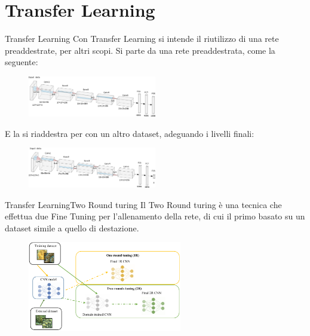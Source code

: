 \documentclass[aspectratio=169]{beamer}
\begin{document}
\section{Transfer Learning}
\begin{frame}{Transfer Learning}
    Con Transfer Learning si intende il riutilizzo di una rete preaddestrate, per altri scopi. Si parte da una rete preaddestrata, come la seguente:
    \begin{figure}[ht]
        \centering
        \includegraphics[width=0.5\textwidth]{addestramento-rete-neurale/alexnet.pdf}
    \end{figure}
    E la si riaddestra per con un altro  dataset, adeguando i livelli finali:
    \begin{figure}[ht]
        \centering
        \includegraphics[width=0.5\textwidth]{addestramento-rete-neurale/alexnet-tl.pdf}
    \end{figure}
\end{frame}

\begin{frame}{Transfer Learning}{Two Round turing}
    Il Two Round turing è una tecnica che effettua due Fine Tuning per l'allenamento della rete, di cui il primo basato su un dataset simile a quello di destazione.
    \begin{figure}[ht]
        \centering
        \includegraphics[width=0.6\textwidth]{transfer-learning/tl_2rt.pdf}
    \end{figure}
\end{frame}
\end{document}
